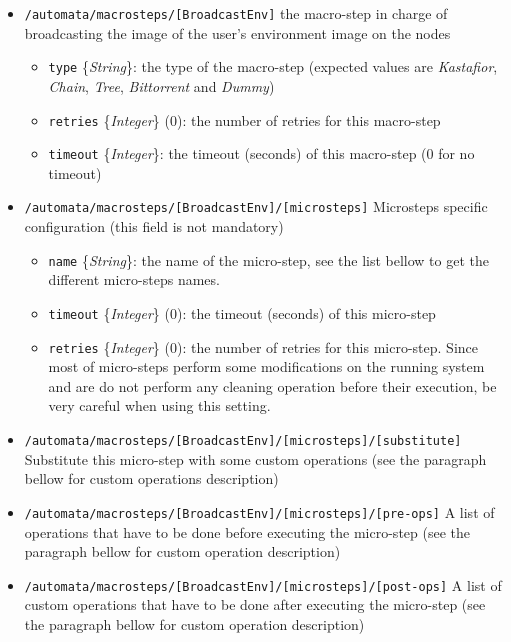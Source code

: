 \documentclass[a4wide,10pt,oneside]{book}
\newcommand{\ypath}[1]{\texttt{#1}}
\newcommand{\yfield}[2]{\texttt{#1} {\small\{{\emph{#2}}\}}:}
\newcommand{\yfieldd}[3]{\texttt{#1} {\small\{{\emph{#2}}\}} {\small(}#3{\small)}:}
\begin{document}
\begin{itemize}
  \item \ypath{/automata/macrosteps/[BroadcastEnv]} the macro-step in charge of broadcasting the image of the user's environment image on the nodes
  \begin{itemize}
    \item \yfield{type}{String} the type of the macro-step (expected values are \emph{Kastafior}, \emph{Chain}, \emph{Tree}, \emph{Bittorrent} and \emph{Dummy})
    \item \yfieldd{retries}{Integer}{0} the number of retries for this macro-step
    \item \yfield{timeout}{Integer} the timeout (seconds) of this macro-step (0 for no timeout)
  \end{itemize}
  \item \ypath{/automata/macrosteps/[BroadcastEnv]/[microsteps]} Microsteps specific configuration (this field is not mandatory)
  \begin{itemize}
    \item \yfield{name}{String} the name of the micro-step, see the list bellow to get the different micro-steps names.
    \item \yfieldd{timeout}{Integer}{0} the timeout (seconds) of this micro-step
    \item \yfieldd{retries}{Integer}{0} the number of retries for this micro-step. Since most of micro-steps perform some modifications on the running system and are do not perform any cleaning operation before their execution, be very careful when using this setting.
  \end{itemize} 
  \item \ypath{/automata/macrosteps/[BroadcastEnv]/[microsteps]/[substitute]} Substitute this micro-step with some custom operations (see the paragraph bellow for custom operations description)
  \item \ypath{/automata/macrosteps/[BroadcastEnv]/[microsteps]/[pre-ops]} A list of operations that have to be done before executing the micro-step (see the paragraph bellow for custom operation description)
  \item \ypath{/automata/macrosteps/[BroadcastEnv]/[microsteps]/[post-ops]} A list of custom operations that have to be done after executing the micro-step (see the paragraph bellow for custom operation description)



\end{itemize}
\end{document}
